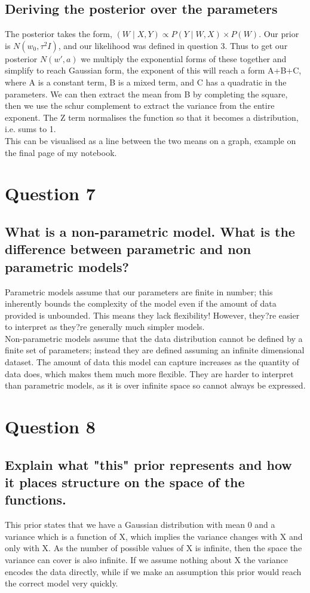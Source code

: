 \documentclass[a4paper, 9pt]{article}
\begin{document}
\subsection*{Deriving the posterior over the parameters}
The posterior takes the form, \( (W \mid X, Y) \propto P(Y \mid W, X) \times P(W) \). Our prior is \( N(w_{0} ,\tau^{2} I) \), and our likelihood was defined in question 3. Thus to get our posterior \( N(w', a) \) we multiply the exponential forms of these together and simplify to reach Gaussian form, the exponent of this will reach a form A+B+C, where A is a constant term, B is a mixed term, and C has a quadratic in the parameters. We can then extract the mean from B by completing the square, then we use the schur complement to extract the variance from the entire exponent. The Z term normalises the function so that it becomes a distribution, i.e. sums to 1.  \\
This can be visualised as a line between the two means on a graph, example on the final page of my notebook.

\section*{Question 7}
\subsection*{What is a non-parametric model. What is the difference between parametric and non parametric models?}
Parametric models assume that our parameters are finite in number; this inherently bounds the complexity of the model even if the amount of data provided is unbounded. This means they lack flexibility! However, they?re easier to interpret as they?re generally much simpler models. \\
Non-parametric models assume that the data distribution cannot be defined by a finite set of parameters; instead they are defined assuming an infinite dimensional dataset. The amount of data this model can capture increases as the quantity of data does, which makes them much more flexible. They are harder to interpret than parametric models, as it is over infinite space so cannot always be expressed.

\section*{Question 8}
\subsection*{Explain what "this" prior represents and how it places structure on the space of the functions.}
This prior states that we have a Gaussian distribution with mean 0 and a variance which is a function of X, which implies the variance changes with X and only with X. As the number of possible values of X is infinite, then the space the variance can cover is also infinite. If we assume nothing about X the variance encodes the data directly, while if we make an assumption this prior would reach the correct model very quickly.
\end{document}
